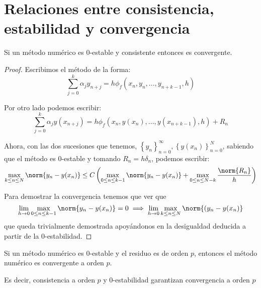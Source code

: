 \documentclass{apuntes}
\begin{document}
\section{Relaciones entre consistencia, estabilidad y convergencia}
\begin{theorem}\label{theorem:consist_y_0estable_converge}
Si un método numérico es 0-estable y consistente entonces es convergente.
\end{theorem}
\begin{proof}
Escribimos el método de la forma:
\[\sum_{j=0}^kα_jy_{n+j} = h \phi_f(x_n,y_n,...,y_{n+k-1},h)\]

Por otro lado podemos escribir:
\[\sum_{j=0}^kα_jy(x_{n+j}) = h \phi_f(x_n,y(x_n),...,y(x_{n+k-1}),h) + R_n\]

Ahora, con las dos sucesiones que tenemos, $\left\{y_n\right\}_{n=0}^∞, \left\{y(x_n)\right\}_{n=0}^N$, sabiendo que el método es 0-estable y tomando $R_n=hδ_n$, podemos escribir:
\[\max_{k\leq n \leq N}\norm{y_n-y(x_n)} \leq C\left( \max_{0 \leq n \leq k-1} \norm{y_n-y(x_n)} + \max_{0 \leq n \leq N-k} \frac{\norm{R_n}}{h}\right)\]

Para demostrar la convergencia tenemos que ver que 
\[\lim_{h \to 0} \max_{0 \leq n \leq k-1} \norm{y_n-y(x_n)}= 0 \implies \lim_{h\to 0} \max_{k\leq n \leq N}\norm{(y_n-y(x_n)} \]
que queda trivialmente demostrada apoyándonos en la desigualdad deducida a partir de la 0-estabilidad.
\end{proof}

\begin{theorem}
Si un método numérico es 0-estable y el residuo es de orden $p$, entonces el método numérico es convergente a orden $p$.

Es decir, consistencia a orden $p$ y 0-estabilidad garantizan convergencia a orden $p$
\end{theorem}
\end{document}
